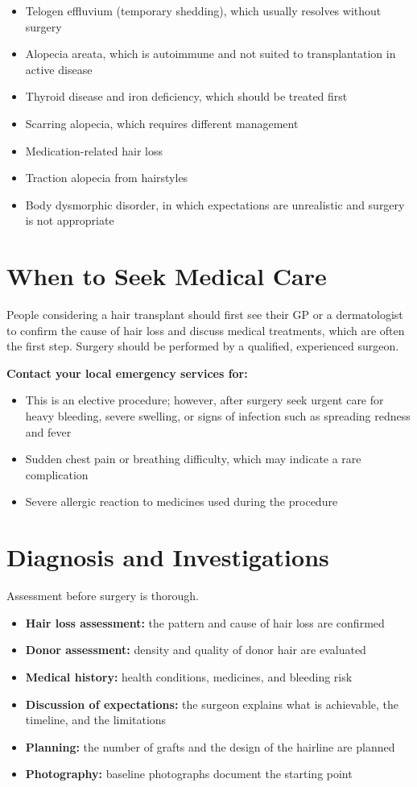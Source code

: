 \begin{itemize}
    \item Telogen effluvium (temporary shedding), which usually resolves without surgery
    \item Alopecia areata, which is autoimmune and not suited to transplantation in active disease
    \item Thyroid disease and iron deficiency, which should be treated first
    \item Scarring alopecia, which requires different management
    \item Medication-related hair loss
    \item Traction alopecia from hairstyles
    \item Body dysmorphic disorder, in which expectations are unrealistic and surgery is not appropriate
\end{itemize}

\section*{When to Seek Medical Care}
People considering a hair transplant should first see their GP or a dermatologist to confirm the cause of hair loss and discuss medical treatments, which are often the first step. Surgery should be performed by a qualified, experienced surgeon.

\textbf{Contact your local emergency services for:}
\begin{itemize}
    \item This is an elective procedure; however, after surgery seek urgent care for heavy bleeding, severe swelling, or signs of infection such as spreading redness and fever
    \item Sudden chest pain or breathing difficulty, which may indicate a rare complication
    \item Severe allergic reaction to medicines used during the procedure
\end{itemize}

\section*{Diagnosis and Investigations}
Assessment before surgery is thorough.

\begin{itemize}
    \item \textbf{Hair loss assessment:} the pattern and cause of hair loss are confirmed
    \item \textbf{Donor assessment:} density and quality of donor hair are evaluated
    \item \textbf{Medical history:} health conditions, medicines, and bleeding risk
    \item \textbf{Discussion of expectations:} the surgeon explains what is achievable, the timeline, and the limitations
    \item \textbf{Planning:} the number of grafts and the design of the hairline are planned
    \item \textbf{Photography:} baseline photographs document the starting point
\end{itemize}

